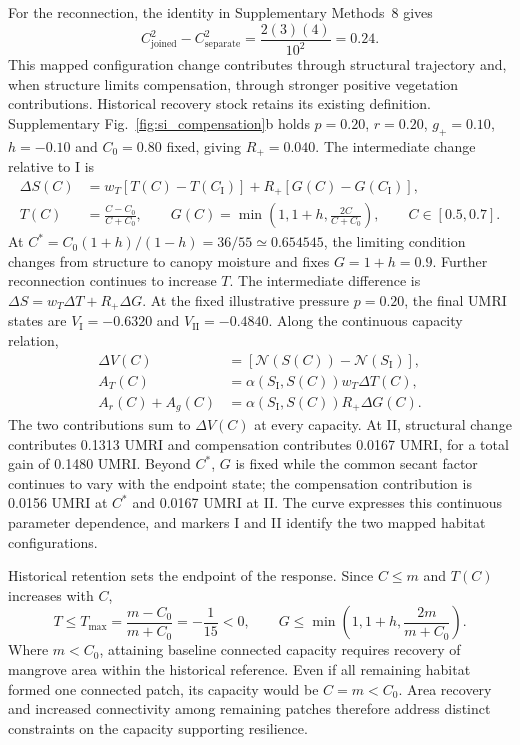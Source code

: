 For the reconnection, the identity in Supplementary Methods~8 gives
\[
C_{\mathrm{joined}}^2-C_{\mathrm{separate}}^2
=\frac{2(3)(4)}{10^2}=0.24.
\]
This mapped configuration change contributes through structural trajectory and, when structure limits compensation, through stronger positive vegetation contributions. Historical recovery stock retains its existing definition. Supplementary Fig.~\ref{fig:si_compensation}b holds $p=0.20$, $r=0.20$, $g_+=0.10$, $h=-0.10$ and $C_0=0.80$ fixed, giving $R_+=0.040$. The intermediate change relative to I is
\[
\begin{aligned}
\Delta S(C)&=w_T[T(C)-T(C_{\mathrm I})]
+R_+[G(C)-G(C_{\mathrm I})],\\
T(C)&=\frac{C-C_0}{C+C_0},\qquad
G(C)=\min\!\left(1,1+h,\frac{2C}{C+C_0}\right),
\qquad C\in[0.5,0.7].
\end{aligned}
\]
At $C^*=C_0(1+h)/(1-h)=36/55\simeq0.654545$, the limiting condition changes from structure to canopy moisture and fixes $G=1+h=0.9$. Further reconnection continues to increase $T$. The intermediate difference is $\Delta S=w_T\Delta T+R_+\Delta G$. At the fixed illustrative pressure $p=0.20$, the final UMRI states are $V_{\mathrm I}=-0.6320$ and $V_{\mathrm{II}}=-0.4840$. Along the continuous capacity relation,
\[
\begin{aligned}
\Delta V(C)&=[\mathcal{N}(S(C))-\mathcal{N}(S_{\mathrm I})],\\
A_T(C)&=\alpha(S_{\mathrm I},S(C))w_T\Delta T(C),\\
A_r(C)+A_g(C)&=\alpha(S_{\mathrm I},S(C))R_+\Delta G(C).
\end{aligned}
\]
The two contributions sum to $\Delta V(C)$ at every capacity. At II, structural change contributes 0.1313 UMRI and compensation contributes 0.0167 UMRI, for a total gain of 0.1480 UMRI. Beyond $C^*$, $G$ is fixed while the common secant factor continues to vary with the endpoint state; the compensation contribution is 0.0156 UMRI at $C^*$ and 0.0167 UMRI at II. The curve expresses this continuous parameter dependence, and markers I and II identify the two mapped habitat configurations.

Historical retention sets the endpoint of the response. Since $C\leq m$ and $T(C)$ increases with $C$,
\[
T\leq T_{\max}=\frac{m-C_0}{m+C_0}=-\frac1{15}<0,
\qquad
G\leq\min\!\left(1,1+h,\frac{2m}{m+C_0}\right).
\]
Where $m<C_0$, attaining baseline connected capacity requires recovery of mangrove area within the historical reference. Even if all remaining habitat formed one connected patch, its capacity would be $C=m<C_0$. Area recovery and increased connectivity among remaining patches therefore address distinct constraints on the capacity supporting resilience.

